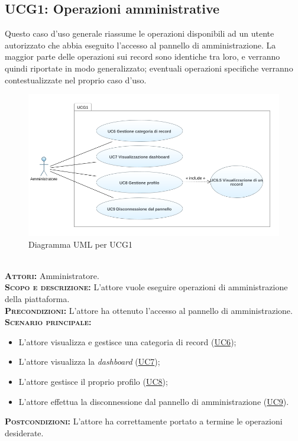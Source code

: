 \subsection{UCG1: Operazioni amministrative}
\label{sec:ucg1}
\label{sec:uc1}    
Questo caso d'uso generale riassume le operazioni disponibili ad un utente autorizzato che abbia eseguito l'accesso al pannello di amministrazione. La maggior parte delle operazioni sui record sono identiche tra loro, e verranno quindi riportate in modo generalizzato; eventuali operazioni specifiche verranno contestualizzate nel proprio caso d'uso.
\begin{figure}[h!]
    \centering
    \includegraphics[width=.8\textwidth]{figures/uc/ucg1.png}
    \caption[Diagramma UML per UCG1]{Diagramma UML per UCG1
    \label{fig:ucg1}}
\end{figure}\\
\textsc{\textbf{Attori:}} Amministratore.\\
\textsc{\textbf{Scopo e descrizione:}} L'attore vuole eseguire operazioni di amministrazione della piattaforma.\\
\textsc{\textsc{\textbf{Precondizioni:}}} L'attore ha ottenuto l'accesso al pannello di amministrazione.\\
\textsc{\textbf{Scenario principale:}} 
\begin{itemize}
    \item L'attore visualizza e gestisce una categoria di record (\hyperref[sec:UC6]{UC6});
    \item L'attore visualizza la \textit{dashboard} (\hyperref[sec:UC7]{UC7});
    \item L'attore gestisce il proprio profilo (\hyperref[sec:UC8]{UC8});
    \item L'attore effettua la disconnessione dal pannello di amministrazione (\hyperref[sec:UC9]{UC9}).
\end{itemize}
\textsc{\textbf{Postcondizioni:}} L'attore ha correttamente portato a termine le operazioni desiderate.


